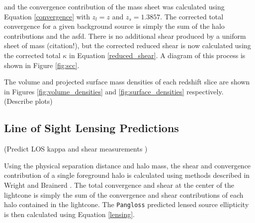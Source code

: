 \documentclass[%
 reprint,
 amsmath,amssymb,
 aps,nofootinbib
]{revtex4-1}
\begin{document}
\noindent and the convergence contribution of the mass sheet was calculated using Equation \eqref{convergence} with ${z_l=z}$ and ${z_s=1.3857}$. The corrected total convergence for a given background source is simply the sum of the halo contributions and the asfd. There is no additional shear produced by a uniform sheet of mass (citation!), but the corrected reduced shear is now calculated using the corrected total $\kappa$ in Equation \eqref{reduced_shear}. A diagram of this process is shown in Figure \ref{fig:scc}.

The volume and projected surface mass densities of each redshift slice are shown in Figures \ref{fig:volume_densities} and \ref{fig:surface_densities} respectively. (Describe plots)


\subsection{Line of Sight Lensing Predictions}

(Predict LOS kappa and shear measurements )

Using the physical separation distance and halo mass, the shear and convergence contribution of a single foreground halo is calculated using methods described in Wright and Brainerd \cite{lensing_calc}. The total convergence and shear at the center of the lightcone is simply the sum of the convergence and shear contributions of each halo contained in the lightcone. The \texttt{Pangloss} predicted lensed source ellipticity is then calculated using Equation \eqref{lensing}.
\end{document}
